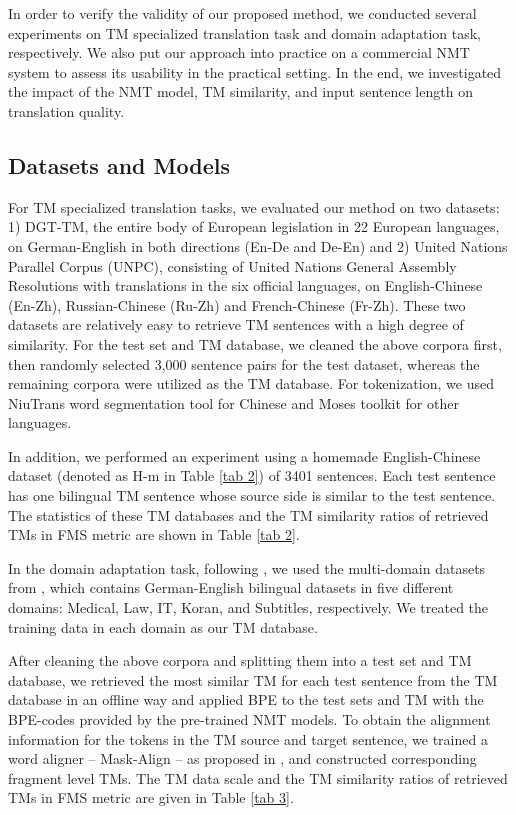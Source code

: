 \documentclass[letterpaper]{article} %
\begin{document}
In order to verify the validity of our proposed method, we conducted several experiments on TM specialized translation task and domain adaptation task, respectively. We also put our approach into practice on a commercial NMT system to assess its usability in the practical setting. In the end, we investigated the impact of the NMT model, TM similarity, and input sentence length on translation quality.

\subsection{Datasets and Models}

For TM specialized translation tasks, we evaluated our method on two datasets: 1) DGT-TM, the entire body of European legislation in 22 European languages, on German-English in both directions (En-De and De-En) and 2) United Nations Parallel Corpus (UNPC), consisting of United Nations General Assembly Resolutions with translations in the six official languages, on English-Chinese (En-Zh), Russian-Chinese (Ru-Zh) and French-Chinese (Fr-Zh). These two datasets are relatively easy to retrieve TM sentences with a high degree of similarity. For the test set and TM database, we cleaned the above corpora first, then randomly selected 3,000 sentence pairs for the test dataset, whereas the remaining corpora were utilized as the TM database. For tokenization, we used NiuTrans \cite{xiao2012niutrans} word segmentation tool for Chinese and
Moses toolkit \cite{philipp2007moses} for other languages.

In addition, we performed an experiment using a homemade English-Chinese dataset (denoted as H-m in Table \ref{tab 2}) of 3401 sentences. Each test sentence has one bilingual TM sentence whose source side is similar to the test sentence. The statistics of these TM databases and the TM similarity ratios of retrieved TMs in FMS metric are shown in Table \ref{tab 2}.

In the domain adaptation task, following \citet{khandelwal2020nearest}, we used the multi-domain datasets from \citet{aharoni2020unsupervised}, which contains German-English bilingual datasets in five different domains: Medical, Law, IT, Koran, and Subtitles, respectively. We treated the training data in each domain as our TM database.

After cleaning the above corpora and splitting them into a test set and TM database, we retrieved the most similar TM for each test sentence from the TM database in an offline way and applied BPE \cite{2016Neural} to the test sets and TM with the BPE-codes provided by the pre-trained NMT models. To obtain the alignment information for the tokens in the TM source and target sentence, we trained a word aligner -- Mask-Align -- as proposed in \citet{chen2021maskalign}, and constructed corresponding fragment level TMs. The TM data scale and the TM similarity ratios of retrieved TMs in FMS metric are given in Table \ref{tab 3}.
\end{document}
